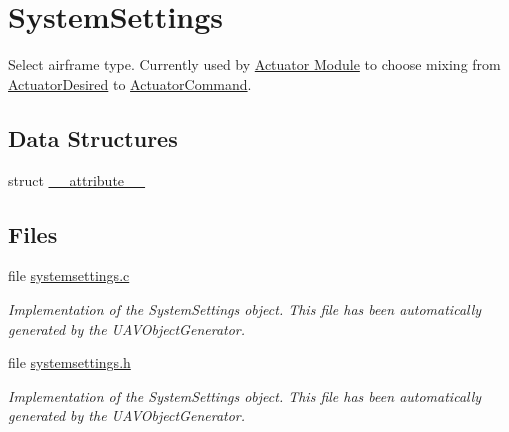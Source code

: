 \hypertarget{group___system_settings}{\section{\-System\-Settings}
\label{group___system_settings}
}


\-Select airframe type. \-Currently used by \hyperlink{group___actuator_module}{\-Actuator \-Module} to choose mixing from \hyperlink{group___actuator_desired}{\-Actuator\-Desired} to \hyperlink{group___actuator_command}{\-Actuator\-Command}.  


\subsection*{\-Data \-Structures}
\begin{DoxyCompactItemize}
\item 
struct \hyperlink{struct____attribute____}{\-\_\-\-\_\-attribute\-\_\-\-\_\-}
\end{DoxyCompactItemize}
\subsection*{\-Files}
\begin{DoxyCompactItemize}
\item 
file \hyperlink{systemsettings_8c}{systemsettings.\-c}
\begin{DoxyCompactList}\small\item\em \-Implementation of the \-System\-Settings object. \-This file has been automatically generated by the \-U\-A\-V\-Object\-Generator. \end{DoxyCompactList}\item 
file \hyperlink{systemsettings_8h}{systemsettings.\-h}
\begin{DoxyCompactList}\small\item\em \-Implementation of the \-System\-Settings object. \-This file has been automatically generated by the \-U\-A\-V\-Object\-Generator. \end{DoxyCompactList}\end{DoxyCompactItemize}

